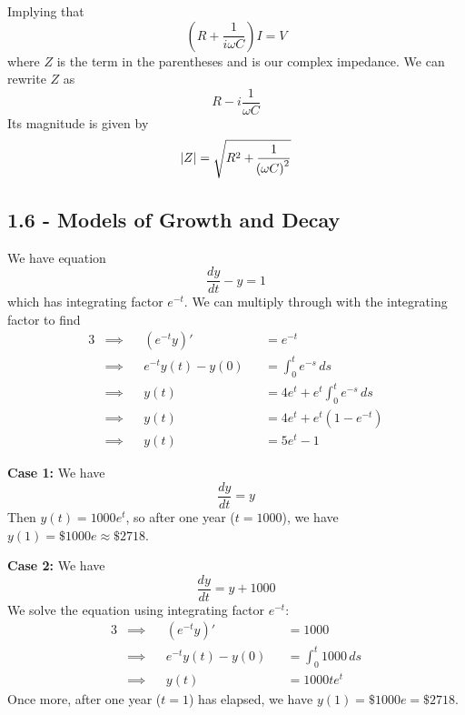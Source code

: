 \documentclass[a4paper]{article}
\begin{document}
Implying that
\[
	\!\left( R + \frac{1}{i \omega C} \right) I = V
\]
where \(Z\) is the term in the parentheses and is our complex impedance. We can rewrite \(Z\) as
\[
	R - i \frac{1}{\omega C}
\]
Its magnitude is given by
\[
	\abs{Z} = \sqrt{R^{2} + \frac{1}{\!\left( \omega C \right)^{2}}}
\]
\newpage
\subsection{\textsf{1.6 - Models of Growth and Decay}}


We have equation
\[
	\frac{d y}{d t} - y = 1
\]
which has integrating factor \(e^{-t}\). We can multiply through with the integrating factor to find
\begin{alignat*}{3}
	&\implies && \!\left( e^{-t} y \right)' && = e^{-t} \\
	&\implies && e^{-t}y \!\left( t \right) - y \!\left( 0 \right) && = \int^{t}_{0} e^{-s} \, ds   \\
	&\implies && y \!\left( t \right) && = 4e^{t} + e^{t} \int^{t}_{0}  e^{-s} \, ds \\
	&\implies && y \!\left( t \right) && = 4e^{t} + e^{t} \!\left( 1 - e^{-t} \right) \\
	&\implies && y \!\left( t \right) && = 5e^{t} - 1
\end{alignat*}


\textbf{Case 1:} We have
\[
	\frac{d y}{d t} = y
\]
Then \(y \!\left( t \right) = 1000e^{t}\), so after one year (\(t = 1000\)), we have \(y \!\left( 1 \right) = \$1000e \approx \$2718\).

\vspace{12pt}

\textbf{Case 2:} We have
\[
	\frac{d y}{d t} = y + 1000
\]
We solve the equation using integrating factor \(e^{-t}\):
\begin{alignat*}{3}
	&\implies && \!\left( e^{-t}y \right)' && = 1000 \\
	&\implies && e^{-t} y \!\left( t \right) - y \!\left( 0 \right) && = \int^{t}_{0} 1000 \, ds    \\
	&\implies && y \!\left( t \right) && = 1000te^{t}
\end{alignat*}
Once more, after one year (\(t = 1\)) has elapsed, we have \(y \!\left( 1 \right) = \$1000e = \$2718\).
\end{document}
